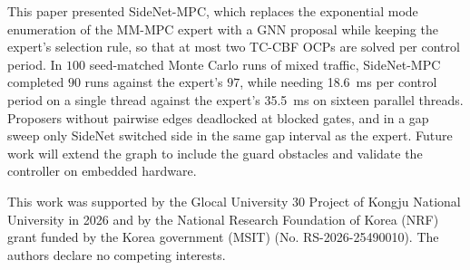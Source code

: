 \documentclass{article}
\theoremstyle{definition}
\begin{document}
This paper presented SideNet-MPC, which replaces the exponential mode enumeration of the MM-MPC expert with a GNN proposal while keeping the expert's selection rule, so that at most two TC-CBF OCPs are solved per control period. In $100$ seed-matched Monte Carlo runs of mixed traffic, SideNet-MPC completed $90$ runs against the expert's $97$, while needing \SI{18.6}{ms} per control period on a single thread against the expert's \SI{35.5}{ms} on sixteen parallel threads. Proposers without pairwise edges deadlocked at blocked gates, and in a gap sweep only SideNet switched side in the same gap interval as the expert. Future work will extend the graph to include the guard obstacles and validate the controller on embedded hardware.
\begin{ack}
This work was supported by the Glocal University 30 Project of Kongju National
University in 2026 and by the National Research Foundation of Korea (NRF)
grant funded by the Korea government (MSIT) (No. RS-2026-25490010).
The authors declare no competing interests.
\end{ack}



\end{document}
